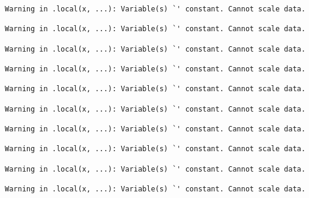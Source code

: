\documentclass[
  letterpaper,
  DIV=11,
  numbers=noendperiod]{scrartcl}
\newenvironment{Shaded}{\begin{snugshade}}{\end{snugshade}}
\newcommand{\AttributeTok}[1]{\textcolor[rgb]{0.40,0.45,0.13}{#1}}
\newcommand{\DecValTok}[1]{\textcolor[rgb]{0.68,0.00,0.00}{#1}}
\newcommand{\FunctionTok}[1]{\textcolor[rgb]{0.28,0.35,0.67}{#1}}
\newcommand{\NormalTok}[1]{\textcolor[rgb]{0.00,0.23,0.31}{#1}}
\newcommand{\OtherTok}[1]{\textcolor[rgb]{0.00,0.23,0.31}{#1}}
\newcommand{\SpecialCharTok}[1]{\textcolor[rgb]{0.37,0.37,0.37}{#1}}
\newcommand{\StringTok}[1]{\textcolor[rgb]{0.13,0.47,0.30}{#1}}
\begin{document}
\begin{verbatim}
Warning in .local(x, ...): Variable(s) `' constant. Cannot scale data.

Warning in .local(x, ...): Variable(s) `' constant. Cannot scale data.

Warning in .local(x, ...): Variable(s) `' constant. Cannot scale data.

Warning in .local(x, ...): Variable(s) `' constant. Cannot scale data.

Warning in .local(x, ...): Variable(s) `' constant. Cannot scale data.

Warning in .local(x, ...): Variable(s) `' constant. Cannot scale data.

Warning in .local(x, ...): Variable(s) `' constant. Cannot scale data.

Warning in .local(x, ...): Variable(s) `' constant. Cannot scale data.

Warning in .local(x, ...): Variable(s) `' constant. Cannot scale data.

Warning in .local(x, ...): Variable(s) `' constant. Cannot scale data.
\end{verbatim}

\begin{Shaded}
\end{Shaded}
\end{document}
